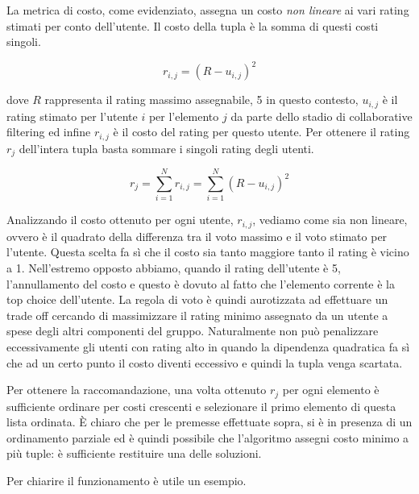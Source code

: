 \documentclass[letterpaper]{article}
\begin{document}
La metrica di costo, come evidenziato, assegna un costo \emph{non lineare} ai vari rating stimati per conto dell'utente. Il costo della tupla è la somma di questi costi singoli.

\begin{equation}
    r_{i,j} = (R - u_{i,j})^2
\end{equation}

dove $R$ rappresenta il rating massimo assegnabile, 5 in questo contesto, $u_{i,j}$ è il rating stimato per l'utente $i$ per l'elemento $j$ da parte dello stadio di collaborative filtering ed infine $r_{i,j}$ è il costo del rating per questo utente. Per ottenere il rating $r_{j}$ dell'intera tupla basta sommare i singoli rating degli utenti.

\begin{equation}
    r_j = \sum_{i=1}^{N} r_{i,j} = \sum_{i=1}^{N} (R - u_{i,j})^2
\end{equation}

Analizzando il costo ottenuto per ogni utente, $r_{i,j}$, vediamo come sia non lineare, ovvero è il quadrato della differenza tra il voto massimo e il voto stimato per l'utente. Questa scelta fa sì che il costo sia tanto maggiore tanto il rating è vicino a 1. Nell'estremo opposto abbiamo, quando il rating dell'utente è 5, l'annullamento del costo e questo è dovuto al fatto che l'elemento corrente è la top choice dell'utente. La regola di voto è quindi aurotizzata ad effettuare un trade off cercando di massimizzare il rating minimo assegnato da un utente a spese degli altri componenti del gruppo. Naturalmente non può penalizzare eccessivamente gli utenti con rating alto in quando la dipendenza quadratica fa sì che ad un certo punto il costo diventi eccessivo e quindi la tupla venga scartata.

Per ottenere la raccomandazione, una volta ottenuto $r_{j}$ per ogni elemento è sufficiente ordinare per costi crescenti e selezionare il primo elemento di questa lista ordinata. \`E chiaro che per le premesse effettuate sopra, si è in presenza di un ordinamento parziale ed è quindi possibile che l'algoritmo assegni costo minimo a più tuple: è sufficiente restituire una delle soluzioni.

Per chiarire il funzionamento è utile un esempio.
\end{document}
